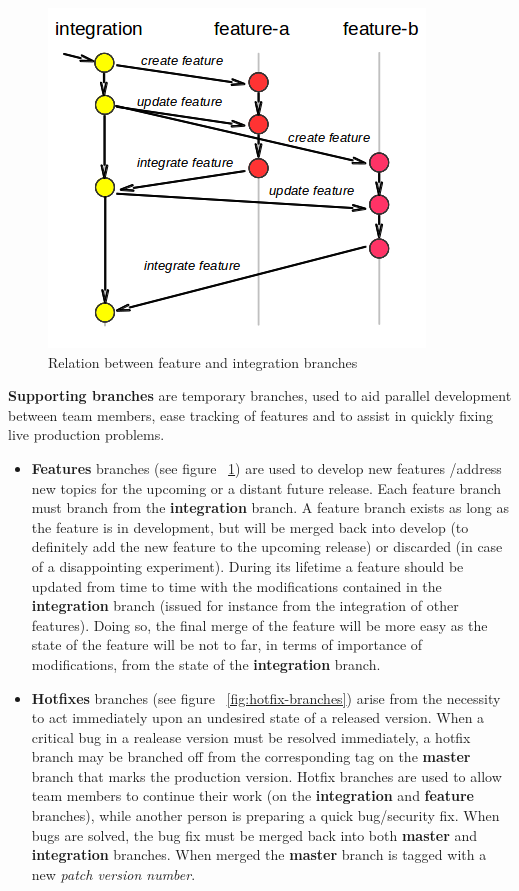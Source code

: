 \documentclass[12pt,a4paper]{article}
\begin{document}
\begin{figure}
\center
\includegraphics[scale=1]{images/feature_branching.png}
\caption{Relation between feature and integration branches}
\label{fig:feature-branches}
\end{figure}

\textbf{Supporting branches} are temporary branches, used to aid parallel development between team members, ease tracking of features and to assist in quickly fixing live production problems.
\begin{itemize}
\item \textbf{Features} branches (see figure ~\ref{fig:feature-branches}) are used to develop new features /address new topics for the upcoming or a distant future release. Each feature branch must branch from the \textbf{integration} branch. A feature branch exists as long as the feature is in development, but will be merged back into develop (to definitely add the new feature to the upcoming release) or discarded (in case of a disappointing experiment). During its lifetime a feature should be updated from time to time with the modifications contained in the \textbf{integration} branch (issued for instance from the integration of other features). Doing so, the final merge of the feature will be more easy as the state of the feature will be not to far, in terms of importance of modifications, from the state of the \textbf{integration} branch.
\item \textbf{Hotfixes} branches (see figure ~\ref{fig:hotfix-branches}) arise from the necessity to act immediately upon an undesired state of a released version. When a critical bug in a realease version must be resolved immediately, a hotfix branch may be branched off from the corresponding tag on the \textbf{master} branch that marks the production version. Hotfix branches are used to allow team members to continue their work (on the \textbf{integration} and \textbf{feature} branches), while another person is preparing a quick bug/security fix. When bugs are solved, the bug fix must be merged back into both \textbf{master} and \textbf{integration} branches. When merged the \textbf{master} branch is tagged with a new \textit{patch version number}.
\end{itemize}
\end{document}
